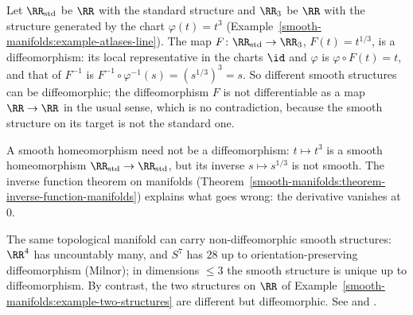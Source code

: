 \begin{example}\label{smooth-manifolds:example-two-structures}
Let $\RR_{\mathrm{std}}$ be $\RR$ with the standard structure and $\RR_3$ be $\RR$ with the structure generated by the chart $\varphi(t) = t^3$
(Example~\ref{smooth-manifolds:example-atlases-line}). The map $F \colon \RR_{\mathrm{std}} \to \RR_3$, $F(t) = t^{1/3}$, is a diffeomorphism: its local
representative in the charts $\id$ and $\varphi$ is $\varphi \circ F(t) = t$, and that of $F^{-1}$ is $F^{-1} \circ \varphi^{-1}(s) = (s^{1/3})^3 = s$. So
different smooth structures can be diffeomorphic; the diffeomorphism $F$ is not differentiable as a map $\RR \to \RR$ in the usual sense, which is no
contradiction, because the smooth structure on its target is not the standard one.
\end{example}

\begin{counterexample}\label{smooth-manifolds:counterexample-smooth-homeomorphism}
A smooth homeomorphism need not be a diffeomorphism: $t \mapsto t^3$ is a smooth homeomorphism $\RR_{\mathrm{std}} \to \RR_{\mathrm{std}}$, but its inverse
$s \mapsto s^{1/3}$ is not smooth. The inverse function theorem on manifolds
(Theorem~\ref{smooth-manifolds:theorem-inverse-function-manifolds}) explains what goes wrong: the derivative vanishes at $0$.
\end{counterexample}

\begin{counterexample}\label{smooth-manifolds:counterexample-exotic}
The same topological manifold can carry non-diffeomorphic smooth structures: $\RR^4$ has uncountably many, and $S^7$ has $28$ up to orientation-preserving
diffeomorphism (Milnor); in dimensions $\leq 3$ the smooth structure is unique up to diffeomorphism. By contrast, the two structures on $\RR$ of
Example~\ref{smooth-manifolds:example-two-structures} are different but diffeomorphic. See \cite{hirsch-differential-topology} and
\cite{milnor-differential-viewpoint}.
\end{counterexample}

